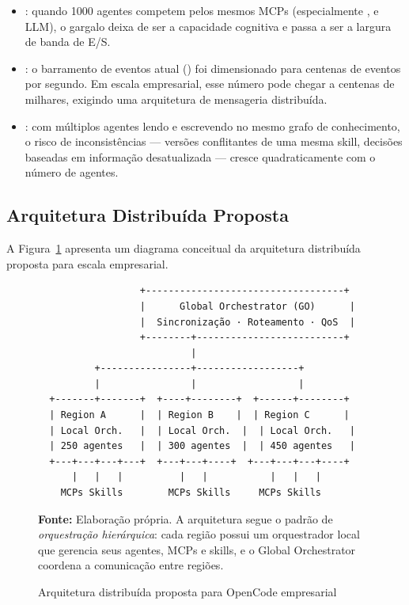 \begin{itemize}
    \item {}: quando 1000 agentes
    competem pelos mesmos MCPs (especialmente ,
     e LLM), o gargalo deixa de ser a capacidade
    cognitiva e passa a ser a largura de banda de E/S.

    \item {}: o barramento de eventos
    atual () foi dimensionado para
    centenas de eventos por segundo. Em escala empresarial, esse
    número pode chegar a centenas de milhares, exigindo uma
    arquitetura de mensageria distribuída.

    \item {}: com múltiplos agentes
    lendo e escrevendo no mesmo grafo de conhecimento, o risco de
    inconsistências --- versões conflitantes de uma mesma skill,
    decisões baseadas em informação desatualizada --- cresce
    quadraticamente com o número de agentes.
\end{itemize}

\subsection{Arquitetura Distribuída Proposta}

A Figura~\ref{fig:arquitetura-distribuida} apresenta um diagrama
conceitual da arquitetura distribuída proposta para escala empresarial.

\begin{figure}[htb]
\centering
\caption{Arquitetura distribuída proposta para OpenCode empresarial}
\label{fig:arquitetura-distribuida}
\begin{verbatim}
                  +-----------------------------------+
                  |      Global Orchestrator (GO)      |
                  |  Sincronização · Roteamento · QoS  |
                  +--------+--------------------------+
                           |
          +----------------+------------------+
          |                |                  |
  +-------+-------+  +----+--------+  +------+--------+
  | Region A      |  | Region B    |  | Region C      |
  | Local Orch.   |  | Local Orch.  |  | Local Orch.   |
  | 250 agentes   |  | 300 agentes  |  | 450 agentes   |
  +---+---+---+---+  +---+---+----+  +---+---+---+----+
      |   |   |          |   |           |   |   |
    MCPs Skills        MCPs Skills     MCPs Skills
\end{verbatim}
\vspace{0.3cm}
\noindent \textbf{Fonte:} Elaboração própria. A arquitetura segue o
padrão de \textit{orquestração hierárquica}: cada região possui um
orquestrador local que gerencia seus agentes, MCPs e skills, e o
Global Orchestrator coordena a comunicação entre regiões.
\end{figure}

